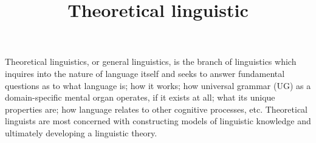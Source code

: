 \documentclass[a4paper]{article}
\title{Theoretical linguistic}
\date{}
\begin{document}
    \maketitle
    Theoretical linguistics, or general linguistics, is the branch of linguistics which inquires into the nature of language itself and seeks to answer fundamental questions as to what language is; how it works; how universal grammar (UG) as a domain-specific mental organ operates, if it exists at all; what its unique properties are; how language relates to other cognitive processes, etc. Theoretical linguists are most concerned with constructing models of linguistic knowledge and ultimately developing a linguistic theory.
    
    
\end{document}
